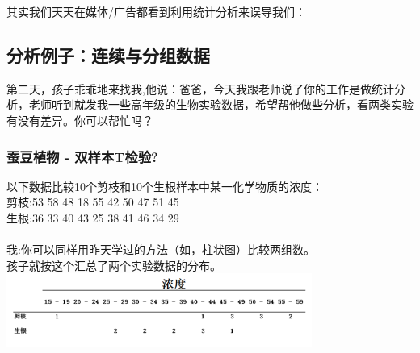 其实我们天天在媒体/广告都看到利用统计分析来误导我们：



\hypertarget{ux5982ux4f55ux753bux830eux53f6ux56festem-and-leaf-plot}{%
\subsection{分析例子：连续与分组数据}\label{ux5982ux4f55ux753bux830eux53f6ux56festem-and-leaf-plot}}

第二天，孩子乖乖地来找我,他说：爸爸，今天我跟老师说了你的工作是做统计分析，老师听到就发我一些高年级的生物实验数据，希望帮他做些分析，看两类实验有没有差异。你可以帮忙吗？\\

\hypertarget{ux8695ux8c46ux690dux7269---ux53ccux6837ux672ctux68c0ux9a8c}{%
\subsubsection{蚕豆植物 -
双样本T检验?}\label{ux8695ux8c46ux690dux7269---ux53ccux6837ux672ctux68c0ux9a8c}}

以下数据比较10个剪枝和10个生根样本中某一化学物质的浓度：\\
剪枝:53 58 48 18 55 42 50 47 51 45\\
生根:36 33 40 43 25 38 41 46 34 29\\
~\\
我:你可以同样用昨天学过的方法（如，柱状图）比较两组数。\\
孩子就按这个汇总了两个实验数据的分布。\\


\includegraphics[width=10cm]{图片61-11.png}

